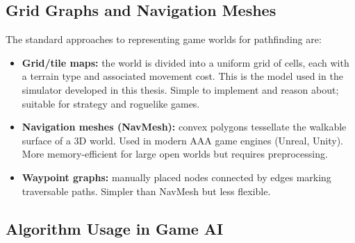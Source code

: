 \documentclass[12pt, a4paper, oneside]{report}
\theoremstyle{definition}
\begin{document}
\subsection{Grid Graphs and Navigation Meshes}

The standard approaches to representing game worlds for pathfinding are:

\begin{itemize}
    \item \textbf{Grid/tile maps:} the world is divided into a uniform grid of cells, each with a terrain type and associated movement cost. This is the model used in the simulator developed in this thesis. Simple to implement and reason about; suitable for strategy and roguelike games.
    \item \textbf{Navigation meshes (NavMesh):} convex polygons tessellate the walkable surface of a 3D world. Used in modern AAA game engines (Unreal, Unity). More memory-efficient for large open worlds but requires preprocessing.
    \item \textbf{Waypoint graphs:} manually placed nodes connected by edges marking traversable paths. Simpler than NavMesh but less flexible.
\end{itemize}

\subsection{Algorithm Usage in Game AI}

\begin{table}[H]
\centering
\caption{Algorithm Usage in Game AI Contexts}
\label{tab:game_ai}
\end{table}
\end{document}
